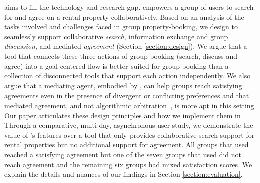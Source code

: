 \tool aims to fill the technology and research gap. \tool empowers a group of users to search for and agree on a rental property collaboratively. Based on an analysis of the tasks involved and challenges faced in group property-booking, we design \tool to seamlessly support collaborative \textit{search}, information exchange and group \textit{discussion}, and mediated \textit{agreement} (Section \ref{section:design}). We argue that a tool that connects these three actions of group booking (search, discuss and agree) into a goal-centered flow is better suited for group booking than a collection of disconnected tools that support each action independently. We also argue that a mediating agent, embodied by \cbot, can help groups reach satisfying agreements even in the presence of divergent or conflicting preferences and that mediated agreement, and not algorithmic arbitration~\cite{spliddit}, is more apt in this setting. Our paper articulates these design principles and how we implement them in \tool. Through a comparative, multi-day, asynchronous user study, we demonstrate the value of \tool's features over a \baseline tool that only provides collaborative search support for rental properties but no additional support for agreement. All groups that used \tool reached a satisfying agreement but one of the seven  groups that used \baseline did not reach agreement and the remaining six groups had mixed satisfaction scores. We explain the details and nuances of our findings in 
Section \ref{section:evaluation}.